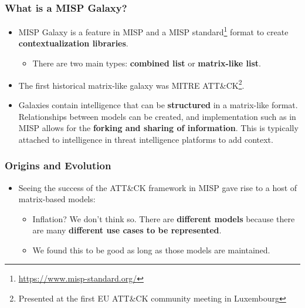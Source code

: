 
\begin{frame}
\titlepage
\end{frame}


\begin{frame}
  \frametitle{What is a MISP Galaxy?}
  \begin{itemize}
	  \item MISP Galaxy is a feature in MISP and a MISP standard\footnote{\url{https://www.misp-standard.org/}} format to create {\bf contextualization libraries}.
    \begin{itemize}
      \item There are two main types: \textbf{combined list} or \textbf{matrix-like list}.
    \end{itemize}
    \item The first historical matrix-like galaxy was MITRE ATT\&CK\footnote{Presented at the first EU ATT\&CK community meeting in Luxembourg}.
    \item Galaxies contain intelligence that can be \textbf{structured} in a matrix-like format. Relationships between models can be created, and implementation such as in MISP allows for the \textbf{forking and sharing of information}. This is typically attached to intelligence in threat intelligence platforms to add context.
  \end{itemize}
\end{frame}


\begin{frame}
   \frametitle{Origins and Evolution}
   \begin{itemize}
       \item Seeing the success of the ATT\&CK framework in MISP gave rise to a host of matrix-based models:
       \begin{itemize}
           \item Inflation? We don’t think so. There are {\bf different models} because there are many {\bf different use cases to be represented}.
           \item We found this to be good as long as those models are maintained.
       \end{itemize}
   \end{itemize}
\end{frame}

